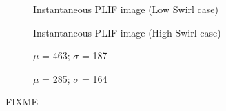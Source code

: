 \begin{figure}

\centering

\begin{subfigure}{0.45\linewidth}
  \centering
  
  \caption{Instantaneous PLIF image (Low Swirl case)}
  \label{fig:referenceVelocityLowVelPLIFImage}
\end{subfigure}
\hfill
\begin{subfigure}{0.45\linewidth}
  \centering
  
  \caption{Instantaneous PLIF image (High Swirl case)}
  \label{fig:referenceVelocityHighVelPLIFImage}
\end{subfigure}

\begin{subfigure}{0.45\linewidth}
  \centering
  
  \caption{\(\mu\) = 463; \(\sigma\) = 187}
  \label{fig:referenceVelocityLowVelPLIFHistogram}
\end{subfigure}
\hfill
\begin{subfigure}{0.45\linewidth}
  \centering
  
  \caption{\(\mu\) = 285; \(\sigma\) = 164}
  \label{fig:referenceVelocityHighVelPLIFHistogram}
\end{subfigure}

\caption[Effect of Swirl on Flame Structure]{FIXME}

\label{fig:swirlPLIFResults}

\end{figure}

